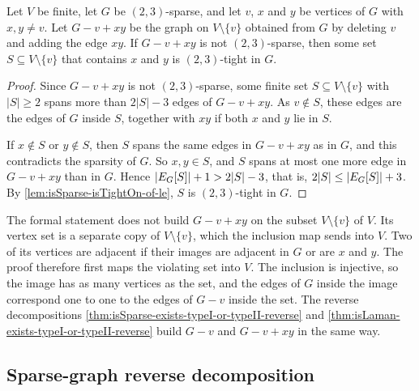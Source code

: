 \begin{lemma}
  \label{lem:isSparse-typeII-reverse-blocker}
  \leanok
  Let $V$ be finite, let $G$ be $(2,3)$-sparse, and let $v$, $x$ and
  $y$ be vertices of $G$ with $x, y \ne v$. Let $G - v + xy$ be the
  graph on $V \setminus \{v\}$ obtained from $G$ by deleting $v$ and
  adding the edge $xy$. If $G - v + xy$ is not $(2,3)$-sparse, then
  some set $S \subseteq V \setminus \{v\}$ that contains $x$ and $y$ is
  $(2,3)$-tight in $G$.
\end{lemma}
\begin{proof}
  \leanok
  Since $G - v + xy$ is not $(2,3)$-sparse, some finite set
  $S \subseteq V \setminus \{v\}$ with $|S| \ge 2$ spans more than
  $2|S| - 3$ edges of $G - v + xy$. As $v \notin S$, these edges are the
  edges of $G$ inside $S$, together with $xy$ if both $x$ and $y$ lie
  in $S$.

  If $x \notin S$ or $y \notin S$, then $S$ spans the same edges in
  $G - v + xy$ as in $G$, and this contradicts the sparsity of $G$. So
  $x, y \in S$, and $S$ spans at most one more edge in $G - v + xy$
  than in $G$. Hence $|E_{G}[S]| + 1 > 2|S| - 3$, that is,
  $2|S| \le |E_{G}[S]| + 3$. By \cref{lem:isSparse-isTightOn-of-le},
  $S$ is $(2,3)$-tight in $G$.
\end{proof}
\begin{fmlnote}
  \label{fmlnote:graph-minus-vertex}
  The formal statement does not build $G - v + xy$ on the subset
  $V \setminus \{v\}$ of $V$. Its vertex set is a separate copy of
  $V \setminus \{v\}$, which the inclusion map sends into $V$. Two of
  its vertices are adjacent if their images are adjacent in $G$ or are
  $x$ and $y$. The proof therefore first maps the violating set into
  $V$. The inclusion is injective, so the image has as many vertices as
  the set, and the edges of $G$ inside the image correspond one to one
  to the edges of $G - v$ inside the set. The reverse decompositions
  \cref{thm:isSparse-exists-typeI-or-typeII-reverse} and
  \cref{thm:isLaman-exists-typeI-or-typeII-reverse} build $G - v$ and
  $G - v + xy$ in the same way.
\end{fmlnote}

\subsection{Sparse-graph reverse decomposition}
\label{sec:isSparse-reverse-decomposition}

